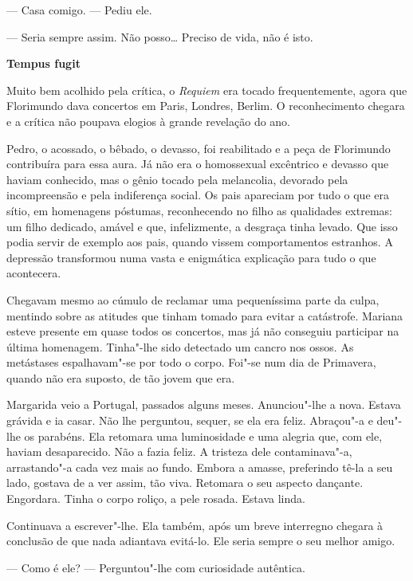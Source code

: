 --- Casa comigo. --- Pediu ele.

--- Seria sempre assim. Não posso\ldots{} Preciso de vida, não é isto.

\vspace*{1.8cm}
\noindent{}\textbf{Tempus fugit}

\bigskip

Muito bem acolhido pela crítica, o \emph{Requiem }era tocado
frequentemente, agora que Florimundo dava concertos em Paris, Londres,
Berlim. O reconhecimento chegara e a crítica não poupava elogios à
grande revelação do ano.

Pedro, o acossado, o bêbado, o devasso, foi reabilitado e a peça de
Florimundo contribuíra para essa aura. Já não era o homossexual
excêntrico e devasso que haviam conhecido, mas o gênio tocado pela
melancolia, devorado pela incompreensão e pela indiferença social. Os
pais apareciam por tudo o que era sítio, em homenagens póstumas,
reconhecendo no filho as qualidades extremas: um filho dedicado, amável
e que, infelizmente, a desgraça tinha levado. Que isso podia servir de
exemplo aos pais, quando vissem comportamentos estranhos. A depressão
transformou numa vasta e enigmática explicação para tudo o que
acontecera.

Chegavam mesmo ao cúmulo de reclamar uma pequeníssima parte da culpa,
mentindo sobre as atitudes que tinham tomado para evitar a catástrofe.
Mariana esteve presente em quase todos os concertos, mas já não
conseguiu participar na última homenagem. Tinha"-lhe sido detectado um
cancro nos ossos. As metástases espalhavam"-se por todo o corpo. Foi"-se
num dia de Primavera, quando não era suposto, de tão jovem que era.

Margarida veio a Portugal, passados alguns meses. Anunciou"-lhe a nova.
Estava grávida e ia casar. Não lhe perguntou, sequer, se ela era feliz.
Abraçou"-a e deu"-lhe os parabéns. Ela retomara uma luminosidade e uma
alegria que, com ele, haviam desaparecido. Não a fazia feliz. A tristeza
dele contaminava"-a, arrastando"-a cada vez mais ao fundo. Embora a
amasse, preferindo tê-la a seu lado, gostava de a ver assim, tão viva.
Retomara o seu aspecto dançante. Engordara. Tinha o corpo roliço, a pele
rosada. Estava linda.

Continuava a escrever"-lhe. Ela também, após um breve interregno chegara
à conclusão de que nada adiantava evitá-lo. Ele seria sempre o seu
melhor amigo.

--- Como é ele? --- Perguntou"-lhe com curiosidade autêntica.

